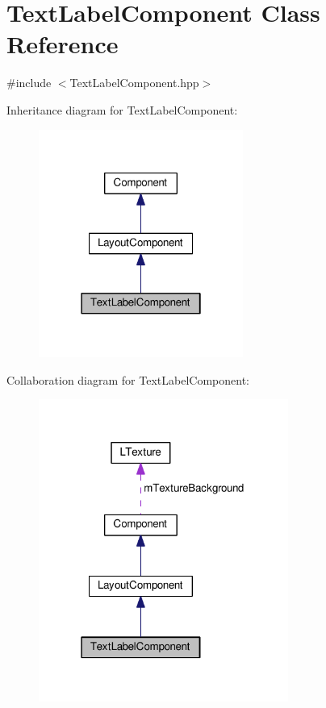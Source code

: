 \hypertarget{class_text_label_component}{}\section{Text\+Label\+Component Class Reference}
\label{class_text_label_component}


{\ttfamily \#include $<$Text\+Label\+Component.\+hpp$>$}



Inheritance diagram for Text\+Label\+Component\+:
\nopagebreak
\begin{figure}[H]
\begin{center}
\leavevmode
\includegraphics[width=190pt]{class_text_label_component__inherit__graph}
\end{center}
\end{figure}


Collaboration diagram for Text\+Label\+Component\+:
\nopagebreak
\begin{figure}[H]
\begin{center}
\leavevmode
\includegraphics[width=232pt]{class_text_label_component__coll__graph}
\end{center}
\end{figure}
